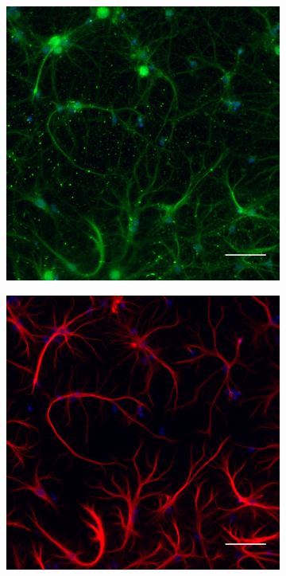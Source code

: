 	\begin{figure}
		\begin{subfigure}[h]{0.329\textwidth}
			\caption{}
			\label{fig:CultureMGmusk}
			\includegraphics[width=\textwidth]{./Images/Immuno/Musk/Cultures/MuSK_50um.jpg}
		\end{subfigure}
		\begin{subfigure}[h]{0.329\textwidth}
			\caption{}
			\label{fig:CultureMGgfap}
			\includegraphics[width=\textwidth]{./Images/Immuno/Musk/Cultures/GFAP_50um.jpg}

\end{subfigure}
\end{figure}
